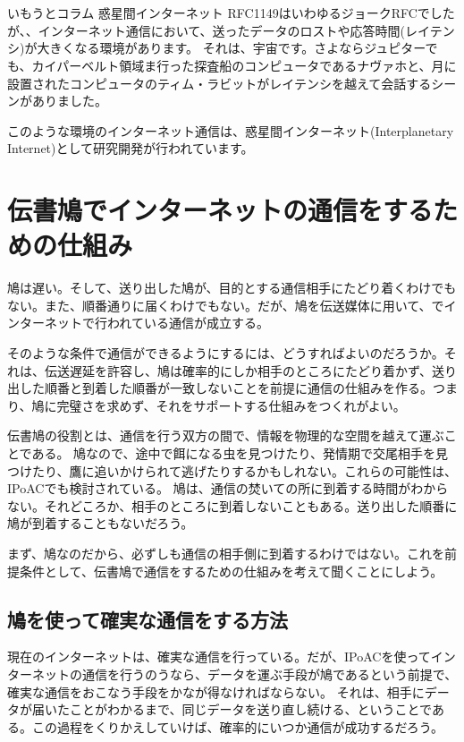 \section*{}
\begin{itembox}[l]{いもうとコラム 惑星間インターネット}
RFC1149はいわゆるジョークRFCでしたが、、インターネット通信において、送ったデータのロストや応答時間(レイテンシ)が大きくなる環境があります。
それは、宇宙です。さよならジュピターでも、カイパーベルト領域ま行った探査船のコンピュータであるナヴァホと、月に設置されたコンピュータのティム・ラビットがレイテンシを越えて会話するシーンがありました。

このような環境のインターネット通信は、惑星間インターネット(Interplanetary Internet)として研究開発が行われています。
\end{itembox}


\section{伝書鳩でインターネットの通信をするための仕組み}
鳩は遅い。そして、送り出した鳩が、目的とする通信相手にたどり着くわけでもない。また、順番通りに届くわけでもない。だが、鳩を伝送媒体に用いて、でインターネットで行われている通信が成立する。

そのような条件で通信ができるようにするには、どうすればよいのだろうか。それは、伝送遅延を許容し、鳩は確率的にしか相手のところにたどり着かず、送り出した順番と到着した順番が一致しないことを前提に通信の仕組みを作る。つまり、鳩に完璧さを求めず、それをサポートする仕組みをつくれがよい。

伝書鳩の役割とは、通信を行う双方の間で、情報を物理的な空間を越えて運ぶことである。
鳩なので、途中で餌になる虫を見つけたり、発情期で交尾相手を見つけたり、鷹に追いかけられて逃げたりするかもしれない。これらの可能性は、IPoACでも検討されている。
鳩は、通信の焚いての所に到着する時間がわからない。それどころか、相手のところに到着しないこともある。送り出した順番に鳩が到着することもないだろう。

まず、鳩なのだから、必ずしも通信の相手側に到着するわけではない。これを前提条件として、伝書鳩で通信をするための仕組みを考えて聞くことにしよう。


\subsection{鳩を使って確実な通信をする方法}

現在のインターネットは、確実な通信を行っている。だが、IPoACを使ってインターネットの通信を行うのうなら、データを運ぶ手段が鳩であるという前提で、確実な通信をおこなう手段をかなが得なければならない。
それは、相手にデータが届いたことがわかるまで、同じデータを送り直し続ける、ということである。この過程をくりかえしていけば、確率的にいつか通信が成功するだろう。


